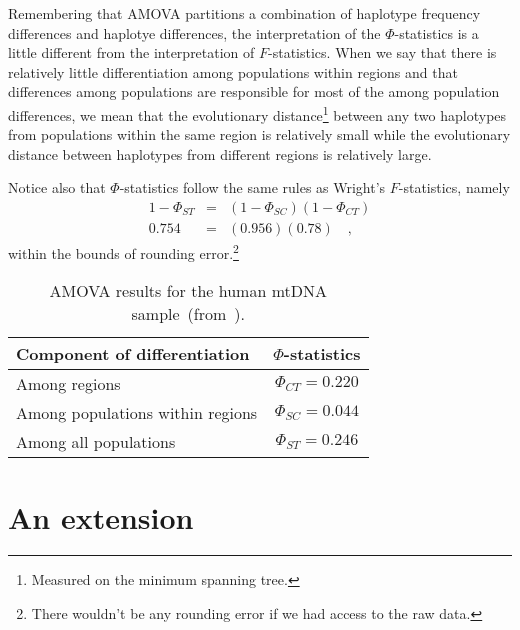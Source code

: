 \documentclass[12pt]{article}
\begin{document}
Remembering that AMOVA partitions a combination of haplotype frequency
differences and haplotye differences, the interpretation of the
$\Phi$-statistics is a little different from the interpretation of
$F$-statistics. When we say that there is relatively little
differentiation among populations within regions and that differences
among populations are responsible for most of the among population
differences, we mean that the evolutionary distance\footnote{Measured
  on the minimum spanning tree.} between any two haplotypes from
populations within the same region is relatively small while the
evolutionary distance between haplotypes from different regions is
relatively large.

Notice also that $\Phi$-statistics follow the same rules as Wright's
$F$-statistics, namely
\begin{eqnarray*}
1 - \Phi_{ST} &=& (1 - \Phi_{SC})(1 - \Phi_{CT}) \\
0.754 &=& (0.956)(0.78) \quad ,
\end{eqnarray*}
within the bounds of rounding error.\footnote{There wouldn't be any
  rounding error if we had access to the raw data.}

\begin{table}
\begin{center}
\begin{tabular}{lc}
\hline\hline
Component of differentiation     & $\Phi$-statistics \\
\hline
Among regions                    & $\Phi_{CT} = 0.220$ \\
Among populations within regions & $\Phi_{SC} = 0.044$ \\
Among all populations            & $\Phi_{ST} = 0.246$ \\
\hline
\end{tabular}
\end{center}
\caption{AMOVA results for the human mtDNA
  sample~(from~\cite{Excoffier-etal92}).}\label{table:amova-results}
\end{table}

\section*{An extension}
\end{document}
